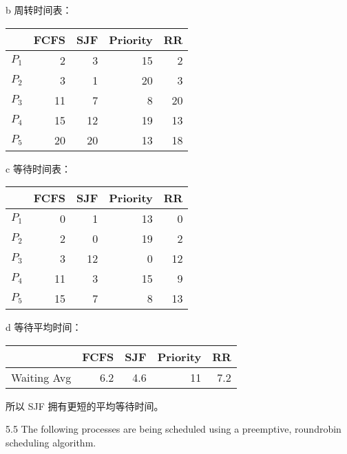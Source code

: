 \documentclass[12pt,a4paper]{article}
\newenvironment{problems}{\begin{list}{}{\renewcommand{\makelabel}[1]{\textbf{##1}\hfil}}}{\end{list}}
\newenvironment{steps}{\begin{list}{}{\renewcommand{\makelabel}[1]{##1.\hfil}}}{\end{list}}
\begin{document}
\begin{problems}
\begin{steps}
            \item[b] 周转时间表：
            \begin{center}
            \begin{tabular}{c|rrrr}
                & FCFS & SJF & Priority & RR \\
                \hline
                $P_1$ & 2 & 3 & 15& 2\\
                $P_2$ & 3 & 1 & 20& 3\\
                $P_3$ & 11& 7 & 8 & 20\\
                $P_4$ & 15& 12& 19& 13\\
                $P_5$ & 20& 20& 13& 18
            \end{tabular}
            \end{center}

            \item[c] 等待时间表：
            \begin{center}
            \begin{tabular}{c|rrrr}
                & FCFS & SJF & Priority & RR \\
                \hline
                $P_1$ & 0 & 1 & 13&0\\
                $P_2$ & 2 & 0 & 19&2\\
                $P_3$ & 3 & 12& 0 &12\\
                $P_4$ & 11& 3 & 15&9\\
                $P_5$ & 15& 7 & 8 &13
            \end{tabular}
            \end{center}
            \item[d] 等待平均时间：
            \begin{center}
            \begin{tabular}{c|rrrr}
                & FCFS & SJF & Priority & RR \\
                \hline
                Waiting Avg & 6.2& 4.6& 11& 7.2\\ 
            \end{tabular}
            \end{center} 

            所以 SJF 拥有更短的平均等待时间。
        \end{steps}

    \item[5.5] The following processes are being scheduled using a preemptive, roundrobin
    scheduling algorithm.


\end{problems}
\end{document}
